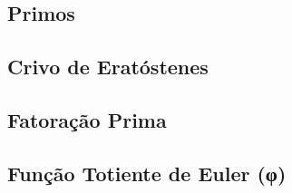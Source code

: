 % 

\subsection{Primos}


\subsection{Crivo de Eratóstenes}


\subsection{Fatoração Prima}


% 

% 

\subsection{Função Totiente de Euler (φ)}


% 

% 

% 


